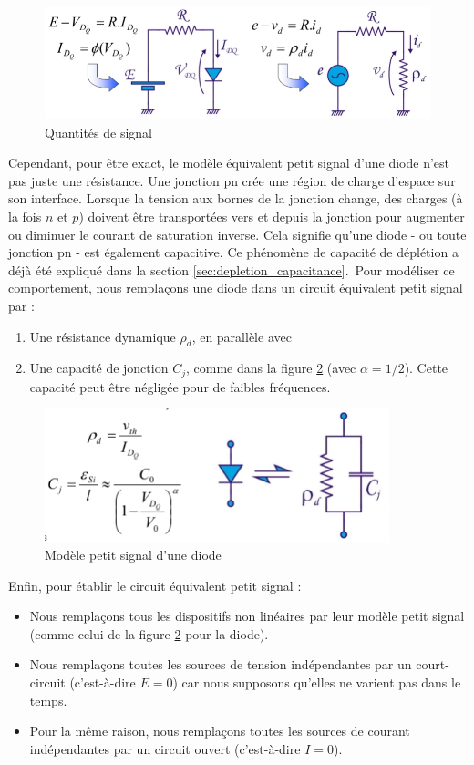 \begin{figure}[h!]
	\centering
	\includegraphics[width=12cm]{figures/ch02/small_signal_resp7.jpg}
	\caption{Quantités de signal}
	\label{fig:small_signal_resp7}
\end{figure}

Cependant, pour être exact, le modèle équivalent petit signal d'une diode n'est pas juste une résistance. Une jonction pn crée une région de charge d'espace sur son interface. Lorsque la tension aux bornes de la jonction change, des charges (à la fois $n$ et $p$) doivent être transportées vers et depuis la jonction pour augmenter ou diminuer le courant de saturation inverse. Cela signifie qu'une diode - ou toute jonction pn - est également capacitive. Ce phénomène de capacité de déplétion a déjà été expliqué dans la section \ref{sec:depletion_capacitance}.\
Pour modéliser ce comportement, nous remplaçons une diode dans un circuit équivalent petit signal par :
\begin{enumerate}
	\item Une résistance dynamique $\rho_d$, en parallèle avec
	\item Une capacité de jonction $C_j$, comme dans la figure \ref{fig:small_signal_resp8} (avec $\alpha = 1/2$). Cette capacité peut être négligée pour de faibles fréquences.
\end{enumerate}
\begin{figure}[h!]
	\centering
	\includegraphics[width=10cm]{figures/ch02/small_signal_resp8.jpg}
	\caption{Modèle petit signal d'une diode}
	\label{fig:small_signal_resp8}
\end{figure}

Enfin, pour établir le circuit équivalent petit signal :
\begin{itemize}
	\item Nous remplaçons tous les dispositifs non linéaires par leur modèle petit signal (comme celui de la figure \ref{fig:small_signal_resp8} pour la diode).
	\item Nous remplaçons toutes les sources de tension indépendantes par un court-circuit (c'est-à-dire $E=0$) car nous supposons qu'elles ne varient pas dans le temps.
	\item Pour la même raison, nous remplaçons toutes les sources de courant indépendantes par un circuit ouvert (c'est-à-dire $I=0$).
\end{itemize}

